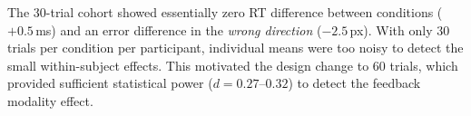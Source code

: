 \documentclass[12pt,letterpaper]{article}
\begin{document}
The 30-trial cohort showed essentially zero RT difference between conditions ($+0.5$\,ms) and an error difference in the \emph{wrong direction} ($-2.5$\,px). With only 30 trials per condition per participant, individual means were too noisy to detect the small within-subject effects. This motivated the design change to 60 trials, which provided sufficient statistical power ($d = 0.27$--$0.32$) to detect the feedback modality effect.
\end{document}
